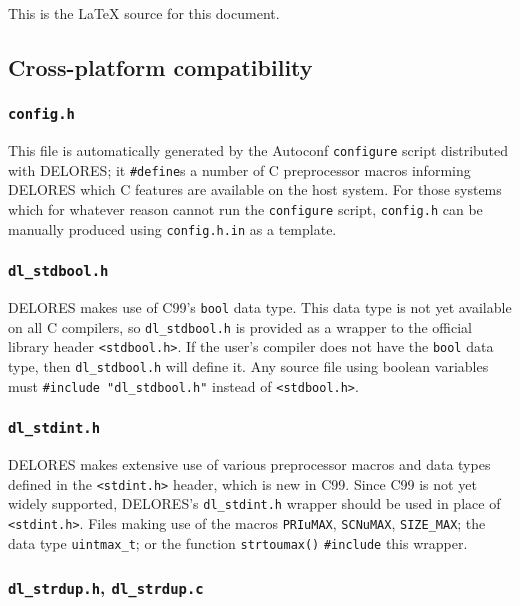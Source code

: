 \documentclass[a4paper,10pt,twocolumn]{article}
\begin{document}
This is the \LaTeX{} source for this document.

\subsection{Cross-platform compatibility}

\subsubsection{\texttt{config.h}}

This file is automatically generated by the Autoconf
\texttt{configure} script distributed with DELORES; it
\texttt{\#define}s a number of C preprocessor macros informing DELORES
which C features are available on the host system.  For those systems
which for whatever reason cannot run the \texttt{configure} script,
\texttt{config.h} can be manually produced using \texttt{config.h.in}
as a template.

\subsubsection{\texttt{dl\_stdbool.h}}

DELORES makes use of C99's \texttt{bool} data type.  This data type is
not yet available on all C compilers, so \texttt{dl\_stdbool.h} is
provided as a wrapper to the official library header
\texttt{<stdbool.h>}.  If the user's compiler does not have the
\texttt{bool} data type, then \texttt{dl\_stdbool.h} will define it.
Any source file using boolean variables must \texttt{\#include
  "dl\_stdbool.h"} instead of \texttt{<stdbool.h>}.

\subsubsection{\texttt{dl\_stdint.h}}

DELORES makes extensive use of various preprocessor macros and data
types defined in the \texttt{<stdint.h>} header, which is new in C99.
Since C99 is not yet widely supported, DELORES's \texttt{dl\_stdint.h}
wrapper should be used in place of \texttt{<stdint.h>}.  Files making
use of the macros \texttt{PRIuMAX}, \texttt{SCNuMAX},
\texttt{SIZE\_MAX}; the data type \texttt{uintmax\_t}; or the function
\texttt{strtoumax()} \texttt{\#include} this wrapper.

\subsubsection{\texttt{dl\_strdup.h}, \texttt{dl\_strdup.c}}
\end{document}
